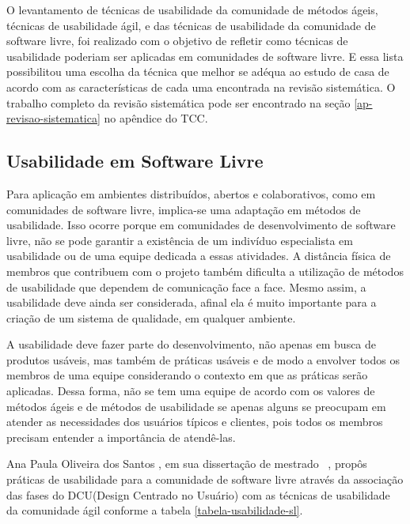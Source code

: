%
O levantamento de técnicas de usabilidade da comunidade de métodos ágeis, técnicas
de usabilidade ágil, e das técnicas de usabilidade da comunidade de software livre, foi
realizado com o objetivo de refletir como técnicas de usabilidade poderiam ser aplicadas
em comunidades de software livre. E essa lista possibilitou uma escolha da técnica que melhor se adéqua ao estudo de casa de acordo com as características de cada uma encontrada na revisão sistemática. O trabalho completo da revisão sistemática pode ser encontrado na seção \ref{ap-revisao-sistematica} no apêndice do TCC.

\subsection{Usabilidade em Software Livre}
\label{usabilidade-sl}
%
Para aplicação em ambientes distribuídos, abertos e colaborativos, como em comunidades de software livre, implica-se uma adaptação em métodos de usabilidade. Isso ocorre porque em comunidades de desenvolvimento de software livre, não se pode garantir a existência de um indivíduo especialista em usabilidade ou de uma equipe dedicada a essas atividades. A distância física de membros que contribuem com o projeto também dificulta a utilização de métodos de usabilidade que dependem de comunicação face a face. Mesmo assim, a usabilidade deve ainda ser considerada, afinal ela é muito importante para a criação de um sistema de qualidade, em qualquer ambiente.

%
A usabilidade deve fazer parte do desenvolvimento, não apenas em busca de produtos usáveis, mas também de práticas usáveis e de modo a envolver todos os membros de uma equipe considerando o contexto em que as práticas serão aplicadas. Dessa forma, não se tem uma equipe de acordo com os valores de métodos ágeis e de métodos de usabilidade se apenas alguns se preocupam em atender as necessidades dos usuários típicos e clientes, pois todos os membros precisam entender a importância de atendê-las.
~\cite{santos2012}

%
Ana Paula Oliveira dos Santos , em sua dissertação de mestrado ~\cite{santos2012}, propôs práticas de usabilidade para a comunidade de software livre através da associação das fases do DCU(Design Centrado no Usuário) com as técnicas de usabilidade da comunidade ágil conforme a tabela \ref{tabela-usabilidade-sl}.


